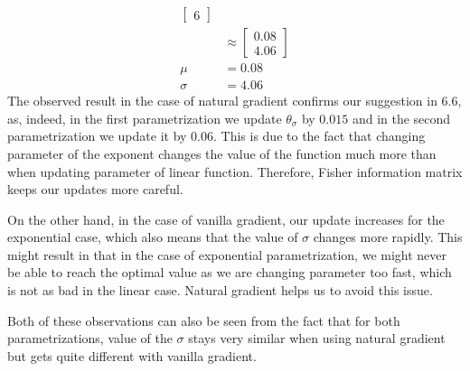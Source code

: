 \documentclass{exam}
\begin{document}
\begin{enumerate}
\begin{solutionorlines}[2in]
\begin{align*}
\begin{bmatrix}
                6
                \end{bmatrix}\\
                &\approx \begin{bmatrix}
                0.08\\
                4.06
                \end{bmatrix}\\
                \mu &= 0.08\\
                \sigma &= 4.06
            \end{align*}
        The observed result in the case of natural gradient confirms our suggestion in 6.6, as, indeed, in the first parametrization we update $\theta_\sigma$ by $0.015$ and in the second parametrization we update it by $0.06$. This is due to the fact that changing parameter of the exponent changes the value of the function much more than when updating parameter of linear function. Therefore, Fisher information matrix keeps our updates more careful.
        
        On the other hand, in the case of vanilla gradient, our update increases for the exponential case, which also means that the value of $\sigma$ changes more rapidly. This might result in that in the case of exponential parametrization, we might never be able to reach the optimal value as we are changing parameter too fast, which is not as bad in the linear case. Natural gradient helps us to avoid this issue. 
        
        Both of these observations can also be seen from the fact that for both parametrizations, value of the $\sigma$ stays very similar when using natural gradient but gets quite different with vanilla gradient.
         \end{solutionorlines}
\end{enumerate}




\end{document}
